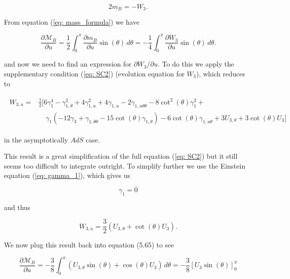 \documentclass[a4paper,11pt]{article}
\numberwithin{equation}{section}
\begin{document}
\begin{equation}
2m_B=-W_3.
\end{equation}

\noindent From equation (\ref{eq: mass_formula}) we have 

\begin{equation}
\frac{ \partial \mathcal{M}_B }{\partial u}=\frac{1}{2} \int_{0}^{\pi} \frac{ \partial m_B}{\partial u} \sin(\theta) \, d\theta = -\frac{1}{4} \int_{0}^{\pi} \frac{ \partial W_3}{\partial u} \sin(\theta) \, d\theta.
\end{equation} 

\noindent and now we need to find an expression for $\partial W_3/\partial u$. To do this we apply the supplementary condition (\ref{eq: SC2}) (evolution equation for $W_3$), which reduces to

\begin{align}
\begin{split}
W_{3, u} = & \frac{1}{2} [6 \gamma_1^4-\gamma_{1,\theta}^2+4 \gamma_{1,u}^2+4 \gamma_{1,u} -2 \gamma_{1, u \theta \theta}-8 \cot ^2(\theta ) \gamma_{1}^2+ \\
& \phantom{aa} \gamma_{1} (-12 \gamma_{3}+\gamma_{1, \theta \theta}-15 \cot (\theta ) \gamma_{1, \theta})-6 \cot (\theta ) \gamma_{1, u \theta}+3 U_{3, \theta }+3 \cot (\theta ) U_{3}]
\end{split}
\end{align}

\noindent in the asymptotically $AdS$ case. \par

This result is a great simplification of the full equation (\ref{eq: SC2}) but it still seems too difficult to integrate outright. To simplify further we use the Einstein equation (\ref{eq: gamma_1}), which gives us 

\begin{equation} \label{eq: gamma_1=0}
\gamma_1=0
\end{equation}

\noindent and thus 

\begin{equation}
W_{3,u}=\frac{3}{2}\left(U_{3, \theta}+ \cot(\theta) U_3\right).
\end{equation}   

We now plug this result back into equation (5.65) to see 

\begin{equation} \label{eq: Bondi_Mass_derivative}
\frac{ \partial \mathcal{M}_B }{\partial u}= -\frac{3}{8} \int_0^{\pi} \left(U_{3, \theta}\sin(\theta)+ \cos(\theta) U_3\right)  \, d\theta = -\frac{3}{8} \left[ U_3 \sin(\theta) \right]^{\pi}_{0}
\end{equation}
\end{document}
